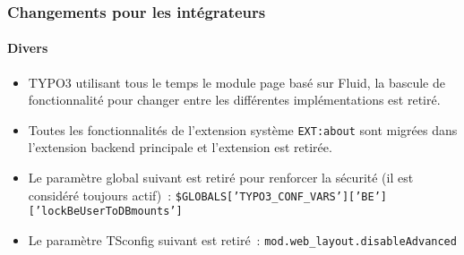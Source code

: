 %

\begin{frame}[fragile]
	\frametitle{Changements pour les intégrateurs}
	\framesubtitle{Divers}

	\begin{itemize}
		\item TYPO3 utilisant tous le temps le module page basé sur Fluid, la bascule
			de fonctionnalité pour changer entre les différentes implémentations est retiré.
		\item Toutes les fonctionnalités de l'extension système \texttt{EXT:about} sont
			migrées dans l'extension backend principale et l'extension est retirée.
		\item Le paramètre global suivant est retiré pour renforcer la sécurité
			(il est considéré toujours actif)~:\newline
			\smaller\texttt{\$GLOBALS['TYPO3\_CONF\_VARS']['BE']['lockBeUserToDBmounts']}\normalsize
		\item Le paramètre TSconfig suivant est retiré~:\newline
			\smaller\texttt{mod.web\_layout.disableAdvanced}\normalsize
	\end{itemize}

\end{frame}

